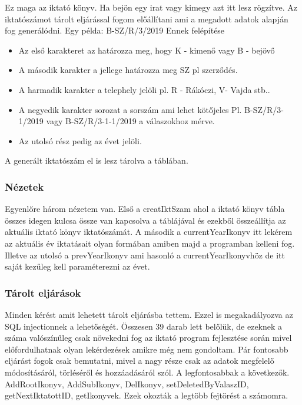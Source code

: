 \documentclass[conference]{IEEEtran}
\begin{document}
\begin{itemize}
	Ez maga az iktató könyv. Ha bejön egy irat vagy kimegy azt itt lesz rögzítve. Az iktatószámot tárolt eljárással fogom előállítani ami a megadott adatok alapján fog generálódni. Egy példa: B-SZ/R/3/2019 Ennek felépítése
	\begin{itemize}
		\item Az első karakteret az határozza meg, hogy K - kimenő vagy B - bejövő
		\item A második karakter a jellege határozza meg SZ pl szerződés.
		\item A harmadik karakter a telephely jelöli pl. R - Rákóczi, V- Vajda stb..
		\item A negyedik karakter sorozat a sorszám ami lehet kötőjeles Pl. B-SZ/R/3-1/2019 vagy B-SZ/R/3-1-1/2019 a válaszokhoz mérve.
		\item Az utolsó rész pedig az évet jelöli.
		
	\end{itemize}
	A generált iktatószám el is lesz tárolva a táblában.
	
\end{itemize}
\subsubsection{\textbf{Nézetek}}
Egyenlőre három nézetem van. Első a creatIktSzam ahol a iktató könyv tábla összes idegen kulcsa össze van kapcsolva a táblájával és ezekből összeállítja az aktuális iktató könyv iktatószámát. A második a currentYearIkonyv itt lekérem az aktuális év iktatásait olyan formában amiben majd a programban kelleni fog. Illetve az utolsó a prevYearIkonyv ami hasonló a currentYearIkonyvhöz de itt saját kezűleg kell paraméterezni az évet.


\subsubsection{\textbf{Tárolt eljárások}}

Minden kérést amit lehetett tárolt eljárásba tettem. Ezzel is megakadályozva az SQL injectionnek a lehetőségét. Összesen 39 darab lett belőlük, de ezeknek a száma valószínűleg csak növekedni fog az iktató program fejlesztése során mivel előfordulhatnak olyan lekérdezések amikre még nem gondoltam.
Pár fontosabb eljárást fogok csak bemutatni, mivel a nagy része csak az adatok megfelelő módosításáról, törléséről és hozzáadásáról szól. A legfontosabbak a következők.
AddRootIkonyv, AddSubIkonyv, DelIkonyv, setDeletedByValaszID, getNextIktatottID, getIkonyvek. Ezek okozták a legtöbb fejtörést a számomra.
 
\end{document}

